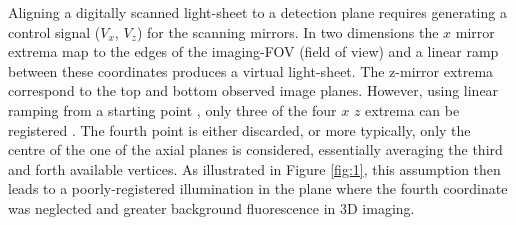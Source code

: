Aligning a digitally scanned light-sheet to a detection plane requires generating %
a control signal ($V_x$, $V_z$) for the scanning mirrors.
In two dimensions the $x$ mirror extrema map to the edges of the imaging-FOV (field of view) and a linear ramp between these coordinates produces a virtual light-sheet.
The z-mirror extrema correspond to the top and bottom observed image planes.
However, using linear ramping from a starting point%
, only three of the four $x$ $z$ extrema %
can be registered
\cite{zitova_image_2003-1}.
The fourth point is either discarded, or more typically, only the centre of the one of the axial planes is considered, essentially averaging the third and forth available vertices. %
As illustrated in Figure \ref{fig:1}, this assumption then leads to a poorly-registered illumination in the plane where the fourth coordinate was neglected and greater background fluorescence in 3D imaging.%


